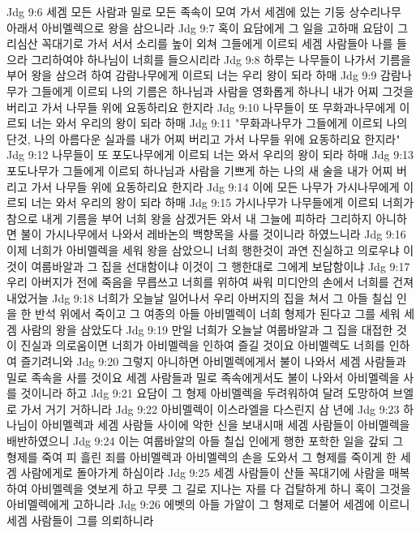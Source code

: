 Jdg 9:6  세겜 모든 사람과 밀로 모든 족속이 모여 가서 세겜에 있는 기둥 상수리나무 아래서 아비멜렉으로 왕을 삼으니라
Jdg 9:7  혹이 요담에게 그 일을 고하매 요담이 그리심산 꼭대기로 가서 서서 소리를 높이 외쳐 그들에게 이르되 세겜 사람들아 나를 들으라 그리하여야 하나님이 너희를 들으시리라
Jdg 9:8  하루는 나무들이 나가서 기름을 부어 왕을 삼으려 하여 감람나무에게 이르되 너는 우리 왕이 되라 하매
Jdg 9:9  감람나무가 그들에게 이르되 나의 기름은 하나님과 사람을 영화롭게 하나니 내가 어찌 그것을 버리고 가서 나무들 위에 요동하리요 한지라
Jdg 9:10  나무들이 또 무화과나무에게 이르되 너는 와서 우리의 왕이 되라 하매
Jdg 9:11  "무화과나무가 그들에게 이르되 나의 단것, 나의 아름다운 실과를 내가 어찌 버리고 가서 나무들 위에 요동하리요 한지라"
Jdg 9:12  나무들이 또 포도나무에게 이르되 너는 와서 우리의 왕이 되라 하매
Jdg 9:13  포도나무가 그들에게 이르되 하나님과 사람을 기쁘게 하는 나의 새 술을 내가 어찌 버리고 가서 나무들 위에 요동하리요 한지라
Jdg 9:14  이에 모든 나무가 가시나무에게 이르되 너는 와서 우리의 왕이 되라 하매
Jdg 9:15  가시나무가 나무들에게 이르되 너희가 참으로 내게 기름을 부어 너희 왕을 삼겠거든 와서 내 그늘에 피하라 그리하지 아니하면 불이 가시나무에서 나와서 레바논의 백향목을 사를 것이니라 하였느니라
Jdg 9:16  이제 너희가 아비멜렉을 세워 왕을 삼았으니 너희 행한것이 과연 진실하고 의로우냐 이것이 여룹바알과 그 집을 선대함이냐 이것이 그 행한대로 그에게 보답함이냐
Jdg 9:17  우리 아버지가 전에 죽음을 무릅쓰고 너희를 위하여 싸워 미디안의 손에서 너희를 건져내었거늘
Jdg 9:18  너희가 오늘날 일어나서 우리 아버지의 집을 쳐서 그 아들 칠십 인을 한 반석 위에서 죽이고 그 여종의 아들 아비멜렉이 너희 형제가 된다고 그를 세워 세겜 사람의 왕을 삼았도다
Jdg 9:19  만일 너희가 오늘날 여룹바알과 그 집을 대접한 것이 진실과 의로움이면 너희가 아비멜렉을 인하여 즐길 것이요 아비멜렉도 너희를 인하여 즐기려니와
Jdg 9:20  그렇지 아니하면 아비멜렉에게서 불이 나와서 세겜 사람들과 밀로 족속을 사를 것이요 세겜 사람들과 밀로 족속에게서도 불이 나와서 아비멜렉을 사를 것이니라 하고
Jdg 9:21  요담이 그 형제 아비멜렉을 두려워하여 달려 도망하여 브엘로 가서 거기 거하니라
Jdg 9:22  아비멜렉이 이스라엘을 다스린지 삼 년에
Jdg 9:23  하나님이 아비멜렉과 세겜 사람들 사이에 악한 신을 보내시매 세겜 사람들이 아비멜렉을 배반하였으니
Jdg 9:24  이는 여룹바알의 아들 칠십 인에게 행한 포학한 일을 갚되 그 형제를 죽여 피 흘린 죄를 아비멜렉과 아비멜렉의 손을 도와서 그 형제를 죽이게 한 세겜 사람에게로 돌아가게 하심이라
Jdg 9:25  세겜 사람들이 산들 꼭대기에 사람을 매복하여 아비멜렉을 엿보게 하고 무릇 그 길로 지나는 자를 다 겁탈하게 하니 혹이 그것을 아비멜렉에게 고하니라
Jdg 9:26  에벳의 아들 가알이 그 형제로 더불어 세겜에 이르니 세겜 사람들이 그를 의뢰하니라

